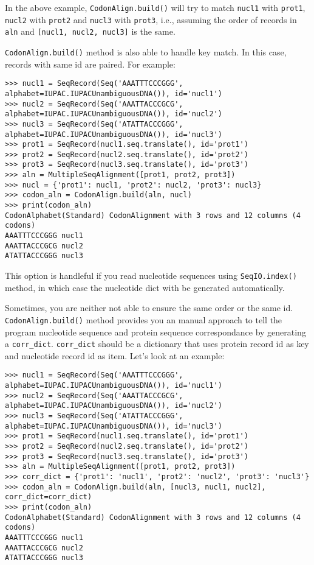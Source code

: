 In the above example, \verb|CodonAlign.build()| will try to match
\texttt{nucl1} with \texttt{prot1}, \texttt{nucl2} with \texttt{prot2}
and \texttt{nucl3} with \texttt{prot3}, i.e., assuming the order of
records in \texttt{aln} and \texttt{{[}nucl1, nucl2, nucl3{]}} is the
same.

\verb|CodonAlign.build()| method is also able to handle key match. In
this case, records with same id are paired. For example:

\begin{verbatim}
>>> nucl1 = SeqRecord(Seq('AAATTTCCCGGG', alphabet=IUPAC.IUPACUnambiguousDNA()), id='nucl1')
>>> nucl2 = SeqRecord(Seq('AAATTACCCGCG', alphabet=IUPAC.IUPACUnambiguousDNA()), id='nucl2')
>>> nucl3 = SeqRecord(Seq('ATATTACCCGGG', alphabet=IUPAC.IUPACUnambiguousDNA()), id='nucl3')
>>> prot1 = SeqRecord(nucl1.seq.translate(), id='prot1')
>>> prot2 = SeqRecord(nucl2.seq.translate(), id='prot2')
>>> prot3 = SeqRecord(nucl3.seq.translate(), id='prot3')
>>> aln = MultipleSeqAlignment([prot1, prot2, prot3])
>>> nucl = {'prot1': nucl1, 'prot2': nucl2, 'prot3': nucl3}
>>> codon_aln = CodonAlign.build(aln, nucl)
>>> print(codon_aln)
CodonAlphabet(Standard) CodonAlignment with 3 rows and 12 columns (4 codons)
AAATTTCCCGGG nucl1
AAATTACCCGCG nucl2
ATATTACCCGGG nucl3
\end{verbatim}

This option is handleful if you read nucleotide sequences using
\verb|SeqIO.index()| method, in which case the nucleotide dict with be
generated automatically.

Sometimes, you are neither not able to ensure the same order or the same
id. \verb|CodonAlign.build()| method provides you an manual approach to
tell the program nucleotide sequence and protein sequence correspondance
by generating a \texttt{corr\_dict}. \texttt{corr\_dict} should be a
dictionary that uses protein record id as key and nucleotide record id
as item. Let's look at an example:

\begin{verbatim}
>>> nucl1 = SeqRecord(Seq('AAATTTCCCGGG', alphabet=IUPAC.IUPACUnambiguousDNA()), id='nucl1')
>>> nucl2 = SeqRecord(Seq('AAATTACCCGCG', alphabet=IUPAC.IUPACUnambiguousDNA()), id='nucl2')
>>> nucl3 = SeqRecord(Seq('ATATTACCCGGG', alphabet=IUPAC.IUPACUnambiguousDNA()), id='nucl3')
>>> prot1 = SeqRecord(nucl1.seq.translate(), id='prot1')
>>> prot2 = SeqRecord(nucl2.seq.translate(), id='prot2')
>>> prot3 = SeqRecord(nucl3.seq.translate(), id='prot3')
>>> aln = MultipleSeqAlignment([prot1, prot2, prot3])
>>> corr_dict = {'prot1': 'nucl1', 'prot2': 'nucl2', 'prot3': 'nucl3'}
>>> codon_aln = CodonAlign.build(aln, [nucl3, nucl1, nucl2], corr_dict=corr_dict)
>>> print(codon_aln)
CodonAlphabet(Standard) CodonAlignment with 3 rows and 12 columns (4 codons)
AAATTTCCCGGG nucl1
AAATTACCCGCG nucl2
ATATTACCCGGG nucl3
\end{verbatim}


